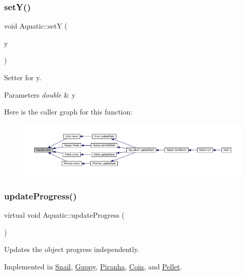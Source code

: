\subsubsection{\texorpdfstring{set\+Y()}{setY()}}
{\footnotesize\ttfamily void Aquatic\+::setY (\begin{DoxyParamCaption}\item[{double}]{y }\end{DoxyParamCaption})}



Setter for y. 


\begin{DoxyParams}{Parameters}
{\em double} & y \\
\hline
\end{DoxyParams}
Here is the caller graph for this function\+:\nopagebreak
\begin{figure}[H]
\begin{center}
\leavevmode
\includegraphics[width=350pt]{class_aquatic_af767ef441e7112a700975f6709b85dc9_icgraph}
\end{center}
\end{figure}
\mbox{\label{class_aquatic_ae1b6301ed27d6aadb73c7ee7879c24af}} 
\subsubsection{\texorpdfstring{update\+Progress()}{updateProgress()}}
{\footnotesize\ttfamily virtual void Aquatic\+::update\+Progress (\begin{DoxyParamCaption}{ }\end{DoxyParamCaption})\hspace{0.3cm}{\ttfamily [pure virtual]}}



Updates the object progress independently. 



Implemented in \mbox{\hyperlink{class_snail_a327c2d31017320c4cd18b48103905fa7}{Snail}}, \mbox{\hyperlink{class_guppy_af22eacc4a1ea7bec4be7b5d82148407b}{Guppy}}, \mbox{\hyperlink{class_piranha_ac4906080867655ef09591eba1cf2f00c}{Piranha}}, \mbox{\hyperlink{class_coin_ac54d7b690f7e415d2220711f718f638e}{Coin}}, and \mbox{\hyperlink{class_pellet_a1a7203cff52c771eb8cc62a91620e3ca}{Pellet}}.


